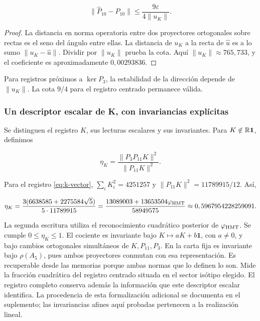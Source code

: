\begin{equation}
\boxed{
\|\widehat P_{10}-P_{10}\|
\le\frac{9\varepsilon}{4\|u_K\|}.
}
\label{nuc11:eq:15}
\end{equation}



\begin{proof}
La distancia en norma operatoria entre dos proyectores ortogonales
sobre rectas es el seno del ángulo entre ellas.
La distancia de \(u_K\) a la recta de \(\widehat u\) es a lo sumo
\(\|u_K-\widehat u\|\). Dividir por \(\|u_K\|\) prueba la cota.
Aquí \(\|u_K\|\approx765{,}733\), y el coeficiente es
aproximadamente \(0{,}00293836\).
\end{proof}
Para registros próximos a \(\ker P_3\), la estabilidad de la
dirección depende de \(\|u_K\|\).
La cota \(9/4\) para el registro centrado permanece válida.

\subsubsection{Un descriptor escalar de K, con invariancias explícitas}

Se distinguen el registro \(K\), sus lecturas escalares y sus
invariantes. Para \(K\notin\mathbb R\mathbf1\), definimos



\begin{equation}
\eta_K=\frac{\|P_3P_{11}K\|^2}{\|P_{11}K\|^2}.
\label{nuc11:eq:16}
\end{equation}



Para el registro \eqref{eq:k-vector},
\(\sum_iK_i^2=4251257\) y
\(\|P_{11}K\|^2=11789915/12\). Así,



\begin{equation}
\eta_K=
\frac{3(6638585+2275584\sqrt5)}{5\cdot11789915}
=\frac{13089003+13653504\varphi_{\rm HMT}}{58949575}
\approx0,5967954228259091.
\label{nuc11:eq:17}
\end{equation}



La segunda escritura utiliza el reconocimiento cuadrático posterior
de \(\varphi_{\rm HMT}\).
Se cumple \(0\le\eta_K\le1\).
El cociente es invariante bajo
\(K\mapsto aK+b\mathbf1\), con \(a\ne0\), y bajo cambios
ortogonales simultáneos de \(K,P_{11},P_3\).
En la carta fija es invariante bajo \(\rho(A_5)\), pues ambos
proyectores conmutan con esa representación.
Es recuperable desde las memorias porque ambas normas que lo
definen lo son.
Mide la fracción cuadrática del registro centrado situada en el
sector isótipo elegido.
El registro completo conserva además la información que este
descriptor escalar identifica.
La procedencia de esta formalización adicional se documenta en
el suplemento; las invariancias afines aquí probadas pertenecen
a la realización lineal.

